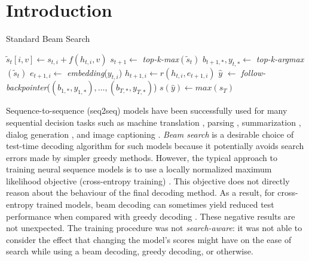\documentclass[letterpaper]{article} %
\begin{document}
\section{Introduction}
\begin{algorithm*}[t]
\caption{Standard Beam Search}\label{hard}
\begin{algorithmic}[1]
\State $\tilde{s}_t[i,v] \gets s_{t,i} + f(h_{t,i},v)$ 
\EndFor
\EndFor
 \State $s_{t+1} \gets$ \textit{top-k-max}$(\tilde{s}_t)$ 
 \State $\textit{b}_{t+1, *}, y_{t, *} \gets$ \textit{top-k-argmax}$(\tilde{s}_t)$ 
  \State $e_{t+1,i} \gets$ \textit{embedding}($y_{t,i}$)
  \State $h_{t+1,i} \gets r(h_{t,i},e_{t+1,i})$ 
 \EndFor
\EndFor
 \State $\hat{y}$ $\gets$ \textit{follow-backpointer}($(b_{1,*},y_{1,*}),\ldots, (b_{T,*},y_{T,*})$)
 \State $s(\hat{y}) \gets \textit{max}(s_T)$
\end{algorithmic}
\end{algorithm*}
Sequence-to-sequence (seq2seq) models have been successfully used for many sequential decision tasks such as machine translation \cite{sutskever2014sequence,bahdanau2014neural}, parsing \cite{dyer2016recurrent,dyer2015transition}, summarization \cite{rush2015neural}, dialog generation \cite{serban2015building}, and image captioning \cite{xu2015show}.
\textit{Beam search} is a desirable choice of test-time decoding algorithm for such models because it potentially avoids search errors made by simpler greedy methods. However, the typical approach to training neural sequence models is to use a locally normalized maximum likelihood objective (cross-entropy training) \cite{sutskever2014sequence}. This objective does not directly reason about the behaviour of the final decoding method. As a result, for cross-entropy trained models, beam decoding can sometimes yield reduced test performance when compared with greedy decoding \cite{koehn2017six,neubig2017neural,cho2014properties}.
These negative results are not unexpected. The training procedure was not \emph{search-aware}: it was not able to consider the effect that changing the model's scores might have on the ease of search while using a beam decoding, greedy decoding, or otherwise. 
\end{document}
